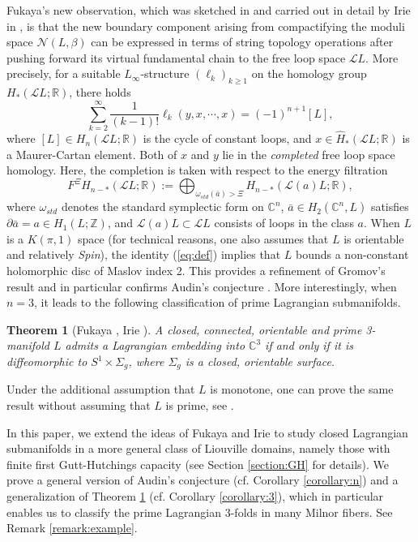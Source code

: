 \documentclass[a4paper]{article}
\newtheorem{theorem}{Theorem}
\numberwithin{equation}{section}
\begin{document}
Fukaya's new observation, which was sketched in \cite{kf} and carried out in detail by Irie in \cite{ki2,ki3}, is that the new boundary component arising from compactifying the moduli space $\mathcal{N}(L,\beta)$ can be expressed in terms of string topology operations after pushing forward its virtual fundamental chain to the free loop space $\mathcal{L}L$. More precisely, for a suitable $L_\infty$-structure $(\ell_k)_{k\geq1}$ on the homology group $H_\ast(\mathcal{L}L;\mathbb{R})$, there holds
\begin{equation}\label{eq:def}
\sum_{k=2}^\infty\frac{1}{(k-1)!}\ell_k(y,x,\cdots,x)=(-1)^{n+1}[L],
\end{equation}
where $[L]\in H_n(\mathcal{L}L;\mathbb{R})$ is the cycle of constant loops, and $x\in\widehat{H}_\ast(\mathcal{L}L;\mathbb{R})$ is a Maurer-Cartan element. Both of $x$ and $y$ lie in the \textit{completed} free loop space homology. Here, the completion is taken with respect to the energy filtration
\begin{equation}
F^\Xi H_{n-\ast}(\mathcal{L}L;\mathbb{R}):=\bigoplus_{\omega_\mathit{std}(\bar{a})>\Xi}H_{n-\ast}(\mathcal{L}(a)L;\mathbb{R}),
\end{equation}
where $\omega_\mathit{std}$ denotes the standard symplectic form on $\mathbb{C}^n$, $\bar{a}\in H_2(\mathbb{C}^n,L)$ satisfies $\partial\bar{a}=a\in H_1(L;\mathbb{Z})$, and $\mathcal{L}(a)L\subset\mathcal{L}L$ consists of loops in the class $a$. When $L$ is a $K(\pi,1)$ space (for technical reasons, one also assumes that $L$ is orientable and relatively \textit{Spin}), the identity (\ref{eq:def}) implies that $L$ bounds a non-constant holomorphic disc of Maslov index 2. This provides a refinement of Gromov's result and in particular confirms Audin's conjecture \cite{ma}. More interestingly, when $n=3$, it leads to the following classification of prime Lagrangian submanifolds.

\begin{theorem}[Fukaya \cite{kf}, Irie \cite{ki2}]\label{theorem:3}
A closed, connected, orientable and prime 3-manifold $L$ admits a Lagrangian embedding into $\mathbb{C}^3$ if and only if it is diffeomorphic to $S^1\times\Sigma_g$, where $\Sigma_g$ is a closed, orientable surface.
\end{theorem}

Under the additional assumption that $L$ is monotone, one can prove the same result without assuming that $L$ is prime, see \cite{ek}.
\bigskip

In this paper, we extend the ideas of Fukaya and Irie to study closed Lagrangian submanifolds in a more general class of Liouville domains, namely those with finite first Gutt-Hutchings capacity (see Section \ref{section:GH} for details). We prove a general version of Audin's conjecture (cf. Corollary \ref{corollary:n}) and a generalization of Theorem \ref{theorem:3} (cf. Corollary \ref{corollary:3}), which in particular enables us to classify the prime Lagrangian 3-folds in many Milnor fibers. See Remark \ref{remark:example}.
\end{document}

